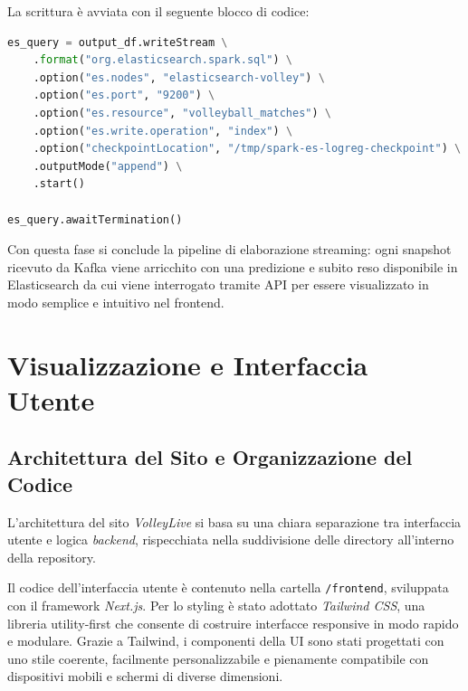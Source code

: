\documentclass[a4paper,12pt]{report}
\begin{document}
\newpage

La scrittura è avviata con il seguente blocco di codice:

\begin{lstlisting}[language=Python]
es_query = output_df.writeStream \
    .format("org.elasticsearch.spark.sql") \
    .option("es.nodes", "elasticsearch-volley") \
    .option("es.port", "9200") \
    .option("es.resource", "volleyball_matches") \
    .option("es.write.operation", "index") \
    .option("checkpointLocation", "/tmp/spark-es-logreg-checkpoint") \
    .outputMode("append") \
    .start()

es_query.awaitTermination()
\end{lstlisting}

Con questa fase si conclude la pipeline di elaborazione streaming: ogni snapshot ricevuto da Kafka viene arricchito con una predizione e subito reso disponibile in Elasticsearch da cui viene interrogato tramite API per essere visualizzato in modo semplice e intuitivo nel frontend.





\chapter{Visualizzazione e Interfaccia Utente}

\section{Architettura del Sito e Organizzazione del Codice}

L’architettura del sito \textit{VolleyLive} si basa su una chiara separazione tra interfaccia utente e logica \textit{backend}, rispecchiata nella suddivisione delle directory all’interno della repository.

Il codice dell’interfaccia utente è contenuto nella cartella \texttt{/frontend}, sviluppata con il framework \textit{Next.js}.
Per lo styling è stato adottato \textit{Tailwind CSS}, una libreria utility-first che consente di costruire interfacce responsive in modo rapido e modulare. Grazie a Tailwind, i componenti della UI sono stati progettati con uno stile coerente, facilmente personalizzabile e pienamente compatibile con dispositivi mobili e schermi di diverse dimensioni.
\end{document}

